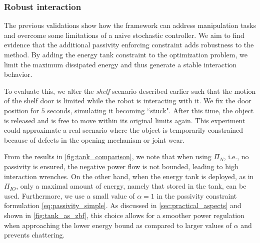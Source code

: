 \vspace{0.3cm}
\subsubsection{Robust interaction}
The previous validations show how the framework can address manipulation tasks and overcome some limitations of a naive stochastic controller. We aim to find evidence that the additional passivity enforcing constraint adds robustness to the method. By adding the energy tank constraint to the optimization problem, we limit the maximum dissipated energy and thus generate a stable interaction behavior.

To evaluate this, we alter the \emph{shelf} scenario described earlier such that the motion of the shelf door is limited while the robot is interacting with it. We fix the door position for $5$ seconds, simulating it becoming ``stuck". After this time, the object is released and is free to move within its original limits again. This experiment could approximate a real scenario where the object is temporarily constrained because of defects in the opening mechanism or joint wear.

From the results in \fig \ref{fig:tank_comparison}, we note that when using $\Pi_{N}$, i.e., no passivity is ensured, the negative power flow is not bounded, leading to high interaction wrenches. On the other hand, when the energy tank is deployed, as in $\Pi_{IO}$, only a maximal amount of energy, namely that stored in the tank, can be used. Furthermore, we use a small value of $\alpha=1$ in the passivity constraint formulation \eqref{eq:passivity_simple}. As discussed in \sect \ref{sec:practical_aspects} and shown in \fig \ref{fig:tank_as_zbf}, this choice allows for a smoother power regulation when approaching the lower energy bound as compared to larger values of $\alpha$ and prevents chattering. 


